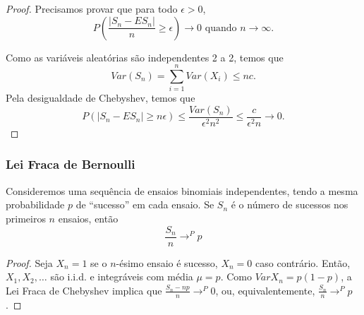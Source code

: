 %
%
%
%


\begin{frame}
\begin{proof}Precisamos provar que para todo $\epsilon>0$,
$$P(\frac{|S_n-ES_n|}{n}\geq \epsilon)\rightarrow 0\mbox{ quando }n\rightarrow\infty.$$

Como as variáveis aleatórias são independentes 2 a 2, temos que
$$Var(S_n)=\sum_{i=1}^{n}Var(X_i)\leq n c.$$ Pela desigualdade de
Chebyshev, temos que
\begin{equation} \label{eq:frac_grand} P(|S_n-ES_n|\geq n\epsilon)\leq
\frac{Var(S_n)}{\epsilon^2 n^2}\leq \frac{c}{\epsilon^2
n}\rightarrow 0. \nonumber\end{equation}

\end{proof}
\end{frame}


\begin{frame}
\frametitle{\textbf{Lei Fraca de Bernoulli}}
\baselineskip=13pt


\begin{corol} Consideremos uma
sequência de ensaios binomiais independentes, tendo a mesma
probabilidade $p$ de ``sucesso'' em cada ensaio. Se $S_n$ é o número
de sucessos nos primeiros $n$ ensaios, então
$$\frac{S_n}{n}\rightarrow^P p$$
\end{corol}

\begin{proof} Seja $X_n=1$ se o $n$-ésimo ensaio é sucesso, $X_n=0$ caso
contrário. Então, $X_1,X_2,\ldots$ são i.i.d. e integráveis com
média $\mu=p$. Como $Var X_n=p(1-p)$, a Lei Fraca de Chebyshev
implica que $\frac{S_n-np}{n}\rightarrow^P 0$, ou, equivalentemente,
$\frac{S_n}{n}\rightarrow^P p$. \end{proof}

\end{frame}


